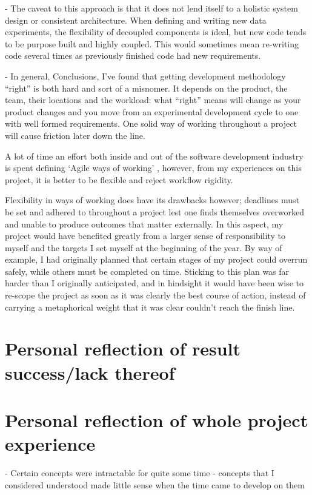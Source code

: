 - The caveat to this approach is that it does not lend itself to a holistic
system design or consistent architecture. When defining and writing new
data experiments, the flexibility of decoupled components is ideal, but new code
tends to be purpose built and highly coupled. This would sometimes mean
re-writing code several times as previously finished code had new requirements. 

- In general, Conclusions, I’ve found that getting development methodology
“right” is both hard and sort of a misnomer. It depends on the product, the
team, their locations and the workload: what “right” means will change as your
product changes and you move from an experimental development cycle to one with
well formed requirements. One solid way of working throughout a project will
cause friction later down the line. 

A lot of time an effort both inside and out of the software development industry
is spent defining `Agile ways of working' \autocite{spolsky_you_2006}, however, from my experiences on this
project, it is better to be flexible and reject workflow rigidity. 

Flexibility in ways of working does have its drawbacks however; deadlines must
be set and adhered to throughout a project lest one finds themselves overworked
and unable to produce outcomes that matter externally. In this aspect, my
project would have benefited greatly from a larger sense of responsibility to
myself and the targets I set myself at the beginning of the year. By way of
example, I had originally planned that certain stages of my project could
overrun safely, while others must be completed on time. Sticking to this plan
was far harder than I originally anticipated, and in hindsight it would have been
wise to re-scope the project as soon as it was clearly the best course of action,
instead of carrying a metaphorical weight that it was clear couldn't reach the
finish line.

\section{Personal reflection of result success/lack thereof}

\section{Personal reflection of whole project experience}
 - Certain concepts were intractable for quite some time 
 - concepts that I considered understood made little sense when the time came to
 develop on them 